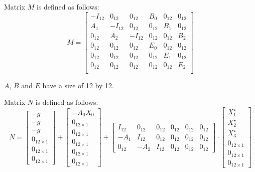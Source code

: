 \documentclass[a4paper,11pt]{article}
\begin{document}
Matrix $M$ is defined as follows:
\begin{equation}
M = \begin{bmatrix} 
-I_{12} & 0_{12} & 0_{12}  & B_0 & 0_{12} & 0_{12}  \\
A_1 & -I_{12} & 0_{12}  & 0_{12} & B_1 & 0_{12} \\
0_{12} & A_2 & -I_{12}  & 0_{12} & 0_{12} & B_2 \\
0_{12} & 0_{12} & 0_{12}  & E_0 & 0_{12} & 0_{12} \\
0_{12} & 0_{12} & 0_{12}  & 0_{12} & E_1 & 0_{12} \\
0_{12} & 0_{12} & 0_{12}  & 0_{12} & 0_{12} & E_2 \\ \end{bmatrix}
\end{equation}

$A$, $B$ and $E$ have a size of 12 by 12.

Matrix $N$ is defined as follows:
\begin{equation}
N = \begin{bmatrix} -g \\ -g \\ -g \\ 0_{12 \times 1} \\ 0_{12 \times 1} \\ 0_{12 \times 1} \end{bmatrix} + \begin{bmatrix} -A_0 X_0 \\ 0_{12 \times 1} \\ 0_{12 \times 1} \\ 0_{12 \times 1} \\ 0_{12 \times 1} \\ 0_{12 \times 1}  \end{bmatrix} + \begin{bmatrix} I_{12} & 0_{12} & 0_{12} & 0_{12} & 0_{12} & 0_{12}\\ -A_1 & I_{12} & 0_{12} & 0_{12} & 0_{12} & 0_{12} \\ 0_{12} & -A_2 & I_{12} & 0_{12} & 0_{12} & 0_{12}\end{bmatrix} \cdot \begin{bmatrix} X_1^\star \\ X_2^\star \\ X_3^\star \\ 0_{12 \times 1} \\ 0_{12 \times 1} \\ 0_{12 \times 1}  \end{bmatrix} 
\end{equation}
\end{document}
